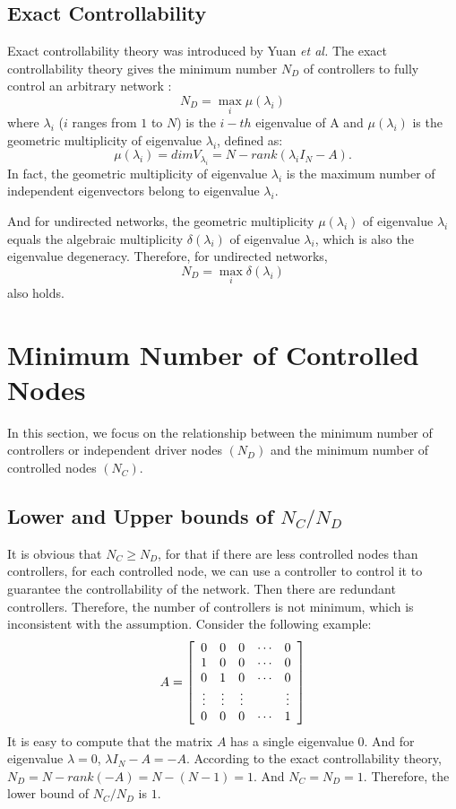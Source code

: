 \documentclass[10pt, conference, letterpaper]{IEEEtran}
\begin{document}
\subsection{Exact Controllability}
Exact controllability theory was introduced by Yuan \emph {et al.} The exact controllability theory gives the minimum number $ N_D $ of controllers to fully control an arbitrary network :
\begin{equation*}
N_D = \max_i {\mu(\lambda_i)}
\end{equation*}
where $\lambda_i$ ($i$ ranges from $1$ to $N$) is the $i-th$ eigenvalue of A and $\mu(\lambda_i)$ is the geometric multiplicity of eigenvalue $\lambda_i$, defined as:
\begin{equation*}
\mu(\lambda_i) = dimV_{\lambda_i} = N - rank(\lambda_iI_N-A).
\end{equation*}
In fact, the geometric multiplicity of eigenvalue $\lambda_i$ is the maximum number of independent eigenvectors belong to eigenvalue $\lambda_i$.

And for undirected networks, the geometric multiplicity $\mu(\lambda_i)$ of eigenvalue $\lambda_i$ equals the algebraic multiplicity $\delta(\lambda_i)$ of eigenvalue $\lambda_i$, which is also the eigenvalue degeneracy. Therefore, for undirected networks,
\begin{equation*}
N_D = \max_i {\delta(\lambda_i)}
\end{equation*}
also holds.
\section{Minimum Number of Controlled Nodes}
In this section, we focus on the relationship between the minimum number of controllers or independent driver nodes $(N_D)$ and the minimum number of controlled nodes $(N_C)$.
\subsection{Lower and Upper bounds of $N_C/N_D$}
It is obvious that $N_C \ge N_D$, for that if there are less controlled nodes than controllers, for each controlled node, we can use a controller to control it to guarantee the controllability of the network. Then there are redundant controllers. Therefore, the number of controllers is not minimum, which is inconsistent with the assumption. Consider the following example:
\begin{equation*}
A = {\left[ \begin{array}{c c c c c}
0 & 0 & 0 & \cdots & 0\\
1 & 0 & 0 & \cdots & 0\\
0 & 1 & 0 & \cdots & 0\\
\vdots & \vdots & \vdots &  & \vdots\\
0 & 0 & 0 & \cdots & 1
\end{array}
\right ]}
\end{equation*}
It is easy to compute that the matrix $A$ has a single eigenvalue $0$. And for eigenvalue $\lambda = 0$, $\lambda I_N - A = -A$. According to the exact controllability theory, $N_D = N - rank(-A) = N - (N - 1) = 1$. And $N_C = N_D = 1$.
Therefore, the lower bound of $N_C/N_D$ is $1$.
\end{document}
